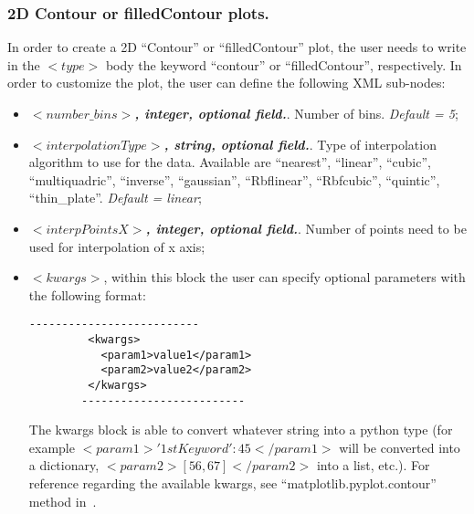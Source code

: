 \subsubsection{2D Contour or filledContour plots.}
In order to create a 2D ``Contour'' or ``filledContour'' plot, the user needs to write in the $<type>$ body the keyword ``contour'' or ``filledContour'', respectively. In order to customize the plot, the user can define the following XML sub-nodes:
  \begin{itemize}
   \item $<number\_bins>$\textbf{\textit{, integer, optional  field.}}. Number of bins. \textit{Default = 5};
     \item $<interpolationType>$\textbf{\textit{, string, optional  field.}}. Type of interpolation algorithm to use for the data. Available are ``nearest'', ``linear'', ``cubic'', ``multiquadric'', ``inverse'', ``gaussian'', ``Rbflinear'', ``Rbfcubic'', ``quintic'', ``thin\_plate''. \textit{Default = linear};
     \item $<interpPointsX>$\textbf{\textit{, integer, optional  field.}}. Number of points need to be used for interpolation of x axis;
 \item \textit{$<kwargs>$},  within this block the user can specify optional parameters with the following format:
        \begin{lstlisting}[style=XML]
        --------------------------
         <kwargs>
           <param1>value1</param1>
           <param2>value2</param2>
         </kwargs>
        -------------------------
       \end{lstlisting}
         The kwargs block is able to convert whatever string into a python type (for example $<param1>{'1stKeyword':45}</param1>$ will be converted into a dictionary, $<param2>[56,67]</param2>$ into a list, etc.). For reference regarding the available kwargs, see ``matplotlib.pyplot.contour'' method in~\cite{MatPlotLib}.
    \end{itemize}

